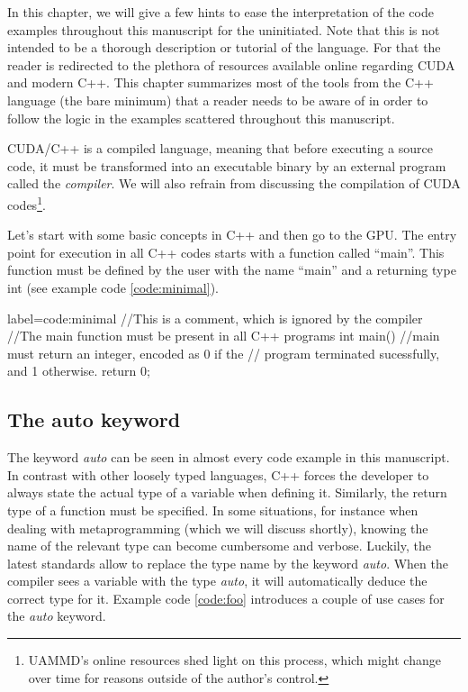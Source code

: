\documentclass[ twoside,openright,titlepage,numbers=noenddot,%
headinclude,footinclude,cleardoublepage=empty,abstract=on,
BCOR=5mm,paper=b5,fontsize=11pt, dvipsnames
]{scrreprt}
\newcommand{\uammd}{\gls{UAMMD}\xspace}
\newcommand{\gpu}{\gls{GPU}\xspace}
\begin{document}
In this chapter, we will give a few hints to ease the interpretation of the code examples throughout this manuscript for the uninitiated. Note that this is not intended to be a thorough description or tutorial of the language. For that the reader is redirected to the plethora of resources available online regarding CUDA and modern C++. This chapter summarizes most of the tools from the C++ language (the bare minimum) that a reader needs to be aware of in order to follow the logic in the examples scattered throughout this manuscript.

CUDA/C++ is a compiled language, meaning that before executing a source code, it must be transformed into an executable binary by an external program called the \emph{compiler}. We will also refrain from discussing the compilation of CUDA codes\footnote{\uammd's online resources shed light on this process, which might change over time for reasons outside of the author's control.}.

Let's start with some basic concepts in C++ and then go to the \gpu. The entry point for execution in all C++ codes starts with a function called ``main''. This function must be defined by the user with the name ``main'' and a returning type int (see example code \ref{code:minimal}).

\begin{code2}
{label=code:minimal}
//This is a comment, which is ignored by the compiler
//The main function must be present in all C++ programs
int main(){
  //main must return an integer, encoded as 0 if the
  // program terminated sucessfully, and 1 otherwise.
  return 0;
}
\end{code2}

\subsection*{The auto keyword}
The keyword \emph{auto} can be seen in almost every code example in this manuscript. In contrast with other loosely typed languages, C++ forces the developer to always state the actual type of a variable when defining it. Similarly, the return type of a function must be specified.
In some situations, for instance when dealing with metaprogramming (which we will discuss shortly), knowing the name of the relevant type can become cumbersome and verbose. Luckily, the latest standards allow to replace the type name by the keyword \emph{auto}. When the compiler sees a variable with the type \emph{auto}, it will automatically deduce the correct type for it. Example code \ref{code:foo} introduces a couple of use cases for the \emph{auto} keyword.
\end{document}
